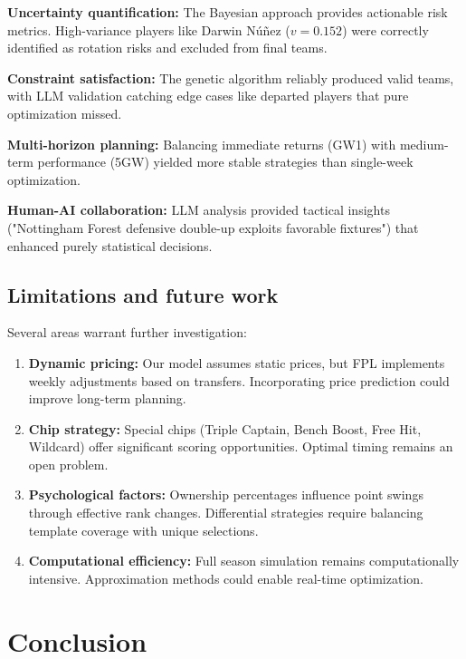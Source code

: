 \documentclass[10pt,a4paper]{article}
\begin{document}
\textbf{Uncertainty quantification:} The Bayesian approach provides actionable risk metrics. High-variance players like Darwin Núñez ($v = 0.152$) were correctly identified as rotation risks and excluded from final teams.

\textbf{Constraint satisfaction:} The genetic algorithm reliably produced valid teams, with LLM validation catching edge cases like departed players that pure optimization missed.

\textbf{Multi-horizon planning:} Balancing immediate returns (GW1) with medium-term performance (5GW) yielded more stable strategies than single-week optimization.

\textbf{Human-AI collaboration:} LLM analysis provided tactical insights ("Nottingham Forest defensive double-up exploits favorable fixtures") that enhanced purely statistical decisions.

\subsection*{Limitations and future work}

Several areas warrant further investigation:

\begin{enumerate}
\item \textbf{Dynamic pricing:} Our model assumes static prices, but FPL implements weekly adjustments based on transfers. Incorporating price prediction could improve long-term planning.

\item \textbf{Chip strategy:} Special chips (Triple Captain, Bench Boost, Free Hit, Wildcard) offer significant scoring opportunities. Optimal timing remains an open problem.

\item \textbf{Psychological factors:} Ownership percentages influence point swings through effective rank changes. Differential strategies require balancing template coverage with unique selections.

\item \textbf{Computational efficiency:} Full season simulation remains computationally intensive. Approximation methods could enable real-time optimization.
\end{enumerate}

\section*{Conclusion}
\end{document}
